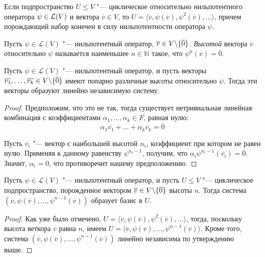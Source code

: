 \begin{note}
	Если подпространство $U \le V$ "--- циклическое относительно нильпотентного оператора $\psi \in \mathcal L(V)$ и вектора $\overline{v} \in V$, то $U = \langle\overline{v}, \psi(\overline{v}), \psi^2(\overline{v}), \dots\rangle$, причем порождающий набор конечен в силу нильпотентности оператора $\psi$.
\end{note}

\begin{definition}
	Пусть $\psi \in \mathcal{L}(V)$ "--- нильпотентный оператор, $\overline{v} \in V \backslash \{\overline 0\}$. \textit{Высотой} вектора $\overline{v}$ относительно $\psi$ называется наименьшее $n \in \mathbb{N}$ такое, что $\psi^n(\overline{v}) = \overline{0}$.
\end{definition}

\begin{proposition}
	Пусть $\psi \in \mathcal{L}(V)$ "--- нильпотентный оператор, и пусть векторы ${\overline{v_1}, \dots, \overline{v_k} \in V \backslash \{\overline 0\}}$ имеют попарно различные высоты относительно $\psi$. Тогда эти векторы образуют линейно независимую систему.
\end{proposition}

\begin{proof}
	Предположим, что это не так, тогда существует нетривиальная линейная комбинация с коэффициентами $\alpha_1, \dotsc, \alpha_k \in F$, равная нулю:
	\[\alpha_1\overline{v_1} + \dots + \alpha_k\overline{v_k} = \overline{0}\]
	
	Пусть $\overline{v_i}$ "--- вектор с наибольшей высотой $n_i$, коэффициент при котором не равен нулю. Применяя к данному равенству $\psi^{n_i - 1}$, получим, что $\alpha_i\psi^{n_i-1}(\overline{v_i}) = \overline{0}$. Значит, $\alpha_i = 0$, что противоречит нашему предположению.
\end{proof}

\begin{corollary}
	Пусть $\psi \in \mathcal{L}(V)$ "--- нильпотентный оператор, и пусть $U \le V$ "--- циклическое подпространство, порожденное вектором $\overline{v} \in V \backslash \{\overline 0\}$ высоты $n$. Тогда система $(\overline{v}, \psi(\overline{v}), \dots, \psi^{n-1}(\overline{v}))$ образует базис в $U$.
\end{corollary}

\begin{proof}
	Как уже было отмечено, $U = \langle\overline{v}, \psi(\overline{v}), \psi^2(\overline{v}), \dots\rangle$, тогда, поскольку высота веткора $\overline{v}$ равна $n$, имеем $U = \langle\overline{v}, \psi(\overline{v}), \dots, \psi^{n - 1}(\overline{v})\rangle$. Кроме того, система $(\overline{v}, \psi(\overline{v}), \dots, \psi^{n-1}(\overline{v}))$ линейно независима по утверждению выше.
\end{proof}


